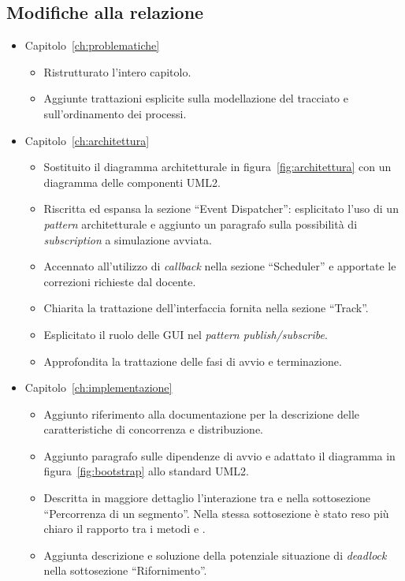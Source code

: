 \subsection*{Modifiche alla relazione}
\begin{itemize}
\item Capitolo~\ref{ch:problematiche}
	\begin{itemize}
	\item Ristrutturato l'intero capitolo.
	\item Aggiunte trattazioni esplicite sulla modellazione del tracciato e sull'ordinamento dei processi.
	\end{itemize}
\item Capitolo~\ref{ch:architettura}
	\begin{itemize}
	\item Sostituito il diagramma architetturale in figura~\ref{fig:architettura} con un diagramma delle componenti UML2.
	\item Riscritta ed espansa la sezione ``Event Dispatcher'': esplicitato l'uso di un \textit{pattern} architetturale e aggiunto un paragrafo sulla possibilità di \textit{subscription} a simulazione avviata.
	\item Accennato all'utilizzo di \textit{callback} nella sezione ``Scheduler'' e apportate le correzioni richieste dal docente.
	\item Chiarita la trattazione dell'interfaccia fornita nella sezione ``Track''.
	\item Esplicitato il ruolo delle GUI nel \textit{pattern \mbox{publish/subscribe}}.
	\item Approfondita la trattazione delle fasi di avvio e terminazione.
	\end{itemize}
\item Capitolo~\ref{ch:implementazione}
	\begin{itemize}
	\item Aggiunto riferimento alla documentazione \Erlang{} per la descrizione delle caratteristiche di concorrenza e distribuzione.
	\item Aggiunto paragrafo sulle dipendenze di avvio e adattato il diagramma in figura~\ref{fig:bootstrap} allo standard UML2.
	\item Descritta in maggiore dettaglio l'interazione tra \car{} e \track{} nella sottosezione ``Percorrenza di un segmento''. Nella stessa sottosezione è stato reso più chiaro il rapporto tra i metodi  e .
	\item Aggiunta descrizione e soluzione della potenziale situazione di \textit{deadlock} nella sottosezione ``Rifornimento''.

\end{itemize}
\end{itemize}

